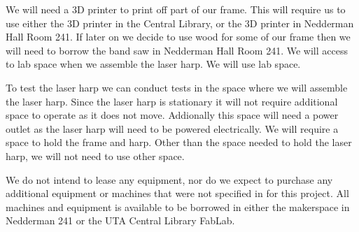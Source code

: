We will need a 3D printer to print off part of our frame. This will require us to use either the 3D printer in the Central Library, or the 3D printer in Nedderman Hall Room 241. If later on we decide to use wood for some of our frame then we will need to borrow the band saw in Nedderman Hall Room 241. We will access to lab space when we assemble the laser harp. We will use lab space.

To test the laser harp we can conduct tests in the space where we will assemble the laser harp. Since the laser harp is stationary it will not require additional space to operate as it does not move. Addionally this space will need a power outlet as the laser harp will need to be powered electrically. We will require a space to hold the frame and harp. Other than the space needed to hold the laser harp, we will not need to use other space.

We do not intend to lease any equipment, nor do we expect to purchase any additional equipment or machines that were not specified in for this project. All machines and equipment is available to be borrowed in either the makerspace in Nedderman 241 or the UTA Central Library FabLab.